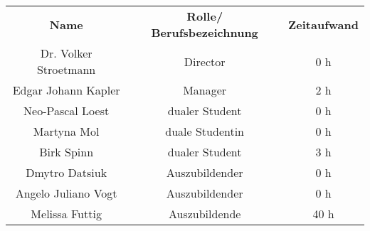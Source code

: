\begin{tabular}{|c|c|c|}
    \rowcolor{heading}\textbf{Name} & \textbf{Rolle/ Berufsbezeichnung} & \textbf{Zeitaufwand} \\
    Dr. Volker Stroetmann & Director & 0 h \\
    \rowcolor{odd}Edgar Johann Kapler & Manager &  2 h \\
    Neo-Pascal Loest & dualer Student & 0 h \\
    \rowcolor{odd}Martyna Mol & duale Studentin & 0 h \\ 
    Birk Spinn & dualer Student & 3 h \\ 
    \rowcolor{odd}Dmytro Datsiuk & Auszubildender & 0 h \\
    Angelo Juliano Vogt & Auszubildender & 0 h \\
    Melissa Futtig & Auszubildende & 40 h \\
    \hline
\end{tabular}